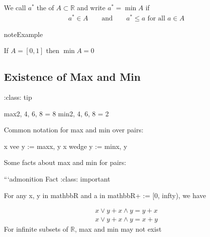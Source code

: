 \documentclass[letterpaper,10pt,english]{jupyterBook}
\begin{document}
\sphinxAtStartPar
We call \(a^*\) the  of \(A \subset \mathbb{R}\) and write \(a^* = \min A\) if
\begin{equation*}
\begin{split}
%
a^* \in A 
\qquad \text{and} \qquad
a^* \leq a
\text{ for all } 
a \in A 
%
\end{split}
\end{equation*}
\begin{sphinxadmonition}{note}{Example}

\sphinxAtStartPar
If \(A = [0, 1]\) then \(\min A = 0\)
\end{sphinxadmonition}


\subsection{Existence of Max and Min}
\label{\detokenize{06.optimization_fundamentals:existence-of-max-and-min}}
\sphinxAtStartPar
:class: tip

\begin{sphinxVerbatim}[commandchars=\\\{\}]

\PYGZpc{}\PYGZhy{} \PYGZdl{}\PYGZbs{}max\PYGZbs{}\PYGZob{}2, 4, 6, 8\PYGZbs{}\PYGZcb{} = 8\PYGZdl{}
\PYGZpc{}\PYGZhy{} \PYGZdl{}\PYGZbs{}min\PYGZbs{}\PYGZob{}2, 4, 6, 8\PYGZbs{}\PYGZcb{} = 2\PYGZdl{}

\PYGZpc{}

\PYGZpc{}Common notation for max and min over pairs:
\PYGZpc{}\PYGZpc{}

\PYGZpc{}\PYGZhy{} \PYGZdl{}x \PYGZbs{}vee y := \PYGZbs{}max\PYGZbs{}\PYGZob{}x, y\PYGZbs{}\PYGZcb{}\PYGZdl{} 
\PYGZpc{}\PYGZhy{} \PYGZdl{}x \PYGZbs{}wedge y := \PYGZbs{}min\PYGZbs{}\PYGZob{}x, y\PYGZbs{}\PYGZcb{}\PYGZdl{}

\PYGZpc{}

\PYGZpc{}

\PYGZpc{}Some facts about max and min for pairs:

\PYGZpc{}

\PYGZpc{}```\PYGZob{}admonition\PYGZcb{} Fact
:class: important

For any \PYGZdl{}x, y \PYGZbs{}in \PYGZbs{}mathbb\PYGZob{}R\PYGZcb{}\PYGZdl{} and \PYGZdl{}a \PYGZbs{}in \PYGZbs{}mathbb\PYGZob{}R\PYGZcb{}\PYGZus{}+ := [0, \PYGZbs{}infty)\PYGZdl{}, we have
\end{sphinxVerbatim}
\begin{equation*}
\begin{split}x \vee y + x \wedge y = y + x\end{split}
\end{equation*}\begin{equation*}
\begin{split}x \vee y + x \wedge y = x + y\end{split}
\end{equation*}
\sphinxAtStartPar
For infinite subsets of \(\mathbb{R}\), max and min may not exist
\end{document}
